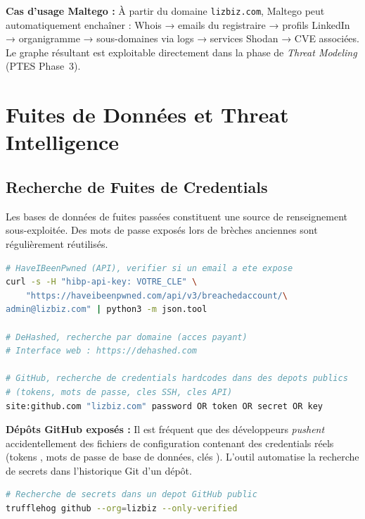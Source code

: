\begin{boxinfo}
\textbf{Cas d'usage Maltego :} À partir du domaine \texttt{lizbiz.com},
Maltego peut automatiquement enchaîner : Whois → emails du registraire →
profils LinkedIn → organigramme → sous-domaines via  logs →
services Shodan → CVE associées. Le graphe résultant est exploitable
directement dans la phase de \textit{Threat Modeling} (PTES Phase~3).
\end{boxinfo}

\section{Fuites de Données et Threat Intelligence}
\label{sec:fuites_threat_intel}

\subsection{Recherche de Fuites de Credentials}
\label{subsec:data_leaks}

Les bases de données de fuites passées constituent une source de renseignement
sous-exploitée. Des mots de passe exposés lors de brèches anciennes sont
régulièrement réutilisés.

\begin{lstlisting}[language=bash, caption={Recherche de fuites de credentials}]
# HaveIBeenPwned (API), verifier si un email a ete expose
curl -s -H "hibp-api-key: VOTRE_CLE" \
    "https://haveibeenpwned.com/api/v3/breachedaccount/\
admin@lizbiz.com" | python3 -m json.tool

# DeHashed, recherche par domaine (acces payant)
# Interface web : https://dehashed.com

# GitHub, recherche de credentials hardcodes dans des depots publics
# (tokens, mots de passe, cles SSH, cles API)
site:github.com "lizbiz.com" password OR token OR secret OR key
\end{lstlisting}

\begin{boxinfo}
\textbf{Dépôts GitHub exposés :} Il est fréquent que des développeurs
\textit{pushent} accidentellement des fichiers de configuration contenant
des credentials réels (tokens \sigle{AWS}, mots de passe de base de données,
clés \sigle{SSH}). L'outil \termecle{truffleHog} automatise la recherche
de secrets dans l'historique Git d'un dépôt.
\begin{lstlisting}[language=bash]
# Recherche de secrets dans un depot GitHub public
trufflehog github --org=lizbiz --only-verified
\end{lstlisting}
\end{boxinfo}


